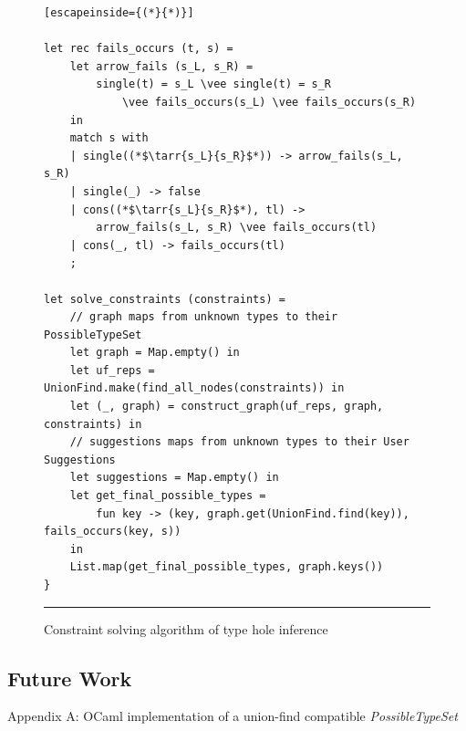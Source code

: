\begin{figure}[htbp]
\begin{lstlisting}[escapeinside={(*}{*)}]

let rec fails_occurs (t, s) =
    let arrow_fails (s_L, s_R) =
        single(t) = s_L \vee single(t) = s_R 
            \vee fails_occurs(s_L) \vee fails_occurs(s_R)
    in
    match s with
    | single((*$\tarr{s_L}{s_R}$*)) -> arrow_fails(s_L, s_R)
    | single(_) -> false
    | cons((*$\tarr{s_L}{s_R}$*), tl) -> 
        arrow_fails(s_L, s_R) \vee fails_occurs(tl)
    | cons(_, tl) -> fails_occurs(tl)
    ;

let solve_constraints (constraints) =
    // graph maps from unknown types to their PossibleTypeSet
    let graph = Map.empty() in
    let uf_reps = UnionFind.make(find_all_nodes(constraints)) in
    let (_, graph) = construct_graph(uf_reps, graph, constraints) in
    // suggestions maps from unknown types to their User Suggestions
    let suggestions = Map.empty() in
    let get_final_possible_types = 
        fun key -> (key, graph.get(UnionFind.find(key)), fails_occurs(key, s))
    in
    List.map(get_final_possible_types, graph.keys())
}

\end{lstlisting}
\vspace{-4px}
 \hrule
\caption{Constraint solving algorithm of type hole inference}
\label{fig:algcode}
\end{figure}


\subsection{Future Work}

Appendix A: OCaml implementation of a union-find compatible \textit{PossibleTypeSet}

